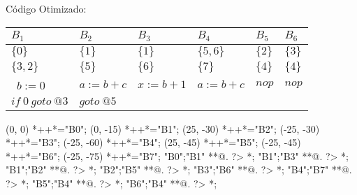 C\'odigo Otimizado:

\begin{table}[ht]
\begin{scriptsize}
\begin{tabular}{l|l|l|l|l|l}
$B_{1}$ & $B_{2}$ & $B_{3}$ & $B_{4}$ & $B_{5}$ & $B_{6}$ \\
\hline
$\{0\}$ & $\{1\}$ & $\{1\}$ & $\{5, 6\}$ & $\{2\}$ & $\{3\}$ \\
$\{3, 2\}$ & $\{5\}$ & $\{6\}$ & $\{7\}$ & $\{4\}$ & $\{4\}$ \\
\hline\
$b:=0$ & $a:=b+c$ & $x:=b+1$ & $a:=b+c$ & $nop$ & $nop$ \\
$if\:0\:goto\:@3$ & $goto\:@5$ &  &  &  &  \\
\end{tabular}
\end{scriptsize}
\end{table}

\begin{scriptsize}
\xy(0, 0)
	*++{}*\frm{-,}="B0";
(0, -15)
	*++{}*\frm{-,}="B1";
(25, -30)
	*++{}*\frm{-,}="B2";
(-25, -30)
	*++{}*\frm{-,}="B3";
(-25, -60)
	*++{}*\frm{-,}="B4";
(25, -45)
	*++{}*\frm{-,}="B5";
(-25, -45)
	*++{}*\frm{-,}="B6";
(-25, -75)
	*++{}*\frm{-,}="B7";
"B0";"B1" **@{.} ?> *{\dir{>}};
"B1";"B3" **@{.} ?> *{\dir{>}};
"B1";"B2" **@{.} ?> *{\dir{>}};
"B2";"B5" **@{.} ?> *{\dir{>}};
"B3";"B6" **@{.} ?> *{\dir{>}};
"B4";"B7" **@{.} ?> *{\dir{>}};
"B5";"B4" **@{.} ?> *{\dir{>}};
"B6";"B4" **@{.} ?> *{\dir{>}};
\endxy
\end{scriptsize}


